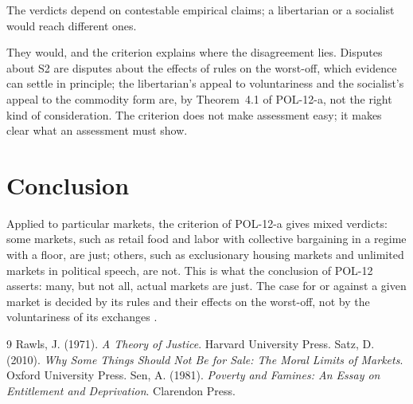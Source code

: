 \documentclass{situationist-preprint}
\begin{document}
\begin{objection}
The verdicts depend on contestable empirical claims; a libertarian or a socialist would reach different ones.
\end{objection}

\begin{reply}
They would, and the criterion explains where the disagreement lies. Disputes about S2 are disputes about the effects of rules on the worst-off, which evidence can settle in principle; the libertarian's appeal to voluntariness and the socialist's appeal to the commodity form are, by Theorem~4.1 of POL-12-a, not the right kind of consideration. The criterion does not make assessment easy; it makes clear what an assessment must show.
\end{reply}

\section{Conclusion}

Applied to particular markets, the criterion of POL-12-a gives mixed verdicts: some markets, such as retail food and labor with collective bargaining in a regime with a floor, are just; others, such as exclusionary housing markets and unlimited markets in political speech, are not. This is what the conclusion of POL-12 asserts: many, but not all, actual markets are just. The case for or against a given market is decided by its rules and their effects on the worst-off, not by the voluntariness of its exchanges \citep{Satz2010}.

\begin{thebibliography}{9}\small
{} Rawls, J. (1971). \emph{A Theory of Justice}. Harvard University Press.
 Satz, D. (2010). \emph{Why Some Things Should Not Be for Sale: The Moral Limits of Markets}. Oxford University Press.
 Sen, A. (1981). \emph{Poverty and Famines: An Essay on Entitlement and Deprivation}. Clarendon Press.
\end{thebibliography}
\end{document}

